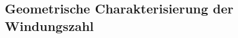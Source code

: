 \documentclass{mythesis}
\begin{document}
\subsection{Geometrische Charakterisierung der Windungszahl}










\end{document}
